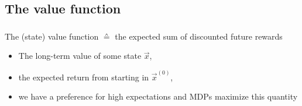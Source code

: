 \subsection{The value function}



\begin{frame}\frametitle{\subsecname}

The (state) value function $\corresponds$ the expected sum of discounted future rewards


\begin{itemize}
\item The long-term value of some state $\vec x$,
\item the expected return from starting in $\vec x^{(0)}$,
\item we have a preference for high expectations and MDPs maximize this quantity
\end{itemize}

\end{frame}

